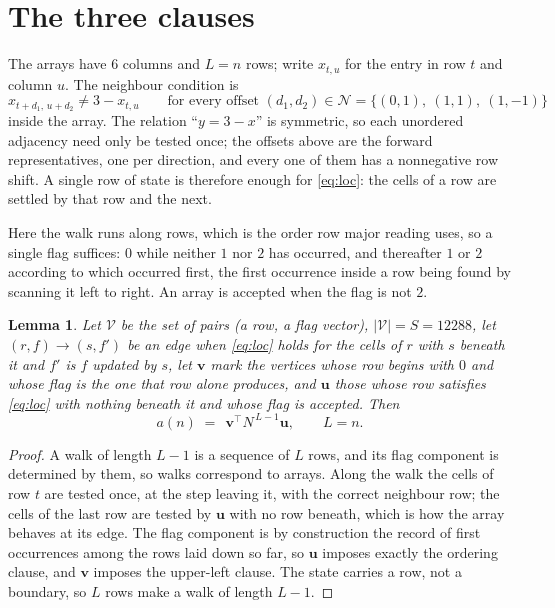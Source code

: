 \documentclass[11pt,a4paper]{article}
\theoremstyle{plain}
\newtheorem{lemma}[theorem]{Lemma}
\theoremstyle{definition}
\begin{document}
\section{The three clauses}

The arrays have $6$ columns and $L=n$ rows; write $x_{t,u}$ for the entry in
row $t$ and column $u$. The neighbour condition is
\begin{equation}\label{eq:loc}
x_{t+d_1,\,u+d_2}\ne 3-x_{t,u}\qquad\text{for every offset }(d_1,d_2)\in\mathcal N=\{(0,1),\ (1,1),\ (1,-1)\}
\end{equation}
inside the array. The relation ``$y=3-x$'' is symmetric, so each unordered adjacency need
only be tested once; the offsets above are the forward representatives, one per direction,
and every one of them has a nonnegative row shift. A single row of state is therefore
enough for \eqref{eq:loc}: the cells of a row are settled by that row and the next.

Here the walk runs along rows, which is the order row
major reading uses, so a single flag suffices: $0$ while neither $1$ nor $2$ has
occurred, and thereafter $1$ or $2$ according to which occurred first, the first occurrence
inside a row being found by scanning it left to right. An array is accepted when the flag
is not $2$.

\begin{lemma}\label{lem:walk}
Let $\mathcal V$ be the set of pairs (a row, a flag vector), $|\mathcal V|=S=12288$, let
$(r,f)\to(s,f')$ be an edge when \eqref{eq:loc} holds for the cells of $r$ with $s$ beneath
it and $f'$ is $f$ updated by $s$, let $\mathbf{v}$ mark the vertices whose row begins
with $0$ and whose flag is the one that row alone produces, and $\mathbf{u}$ those whose
row satisfies \eqref{eq:loc} with nothing beneath it and whose flag is accepted. Then
\[
a(n)\;=\;\,\mathbf{v}^{\!\top}N^{\,L-1}\mathbf{u},\qquad L=n.
\]
\end{lemma}

\begin{proof}
A walk of length $L-1$ is a sequence of $L$ rows, and its flag component is determined by
them, so walks correspond to arrays. Along the walk the cells of row $t$ are tested once,
at the step leaving it, with the correct neighbour row; the cells of the last row are
tested by $\mathbf{u}$ with no row beneath, which is how the array behaves at its edge.
The flag component is by construction the record of first occurrences among the rows laid
down so far, so $\mathbf{u}$ imposes exactly the ordering clause, and $\mathbf{v}$ imposes
the upper-left clause. The state carries a row, not a boundary, so $L$ rows make a walk
of length $L-1$.
\end{proof}
\end{document}
